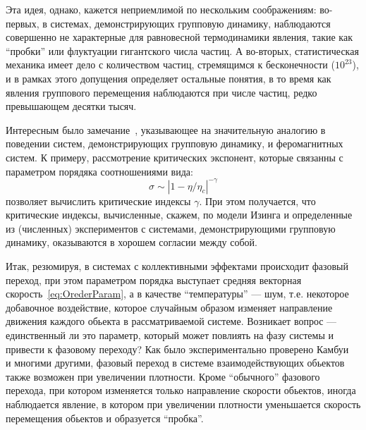     Эта идея, однако, кажется неприемлимой по нескольким соображениям: во-первых, в системах, демонстрирующих групповую динамику, наблюдаются совершенно не характерные для равновесной термодинамики явления, такие как ``пробки'' или флуктуации гигантского числа частиц. А во-вторых, статистическая механика имеет дело с количеством частиц, стремящимся к бесконечности ($10^{23}$), и в рамках этого допущения определяет остальные понятия, в то время как явления группового перемещения наблюдаются при числе частиц, редко превышающем десятки тысяч.

    Интересным было замечание~\cite{tu2000}, указывающее на значительную аналогию в поведении систем, демонстрирующих групповую динамику, и феромагнитных систем. К примеру, рассмотрение критических экспонент, которые связанны с параметром порядяка соотношениями вида:
    \begin{equation}
        \sigma \sim |1-\eta/\eta_c|^{-\gamma}
    \end{equation}
    позволяет вычислить критические индексы $\gamma$. При этом получается, что критические индексы, вычисленные, скажем, по модели Изинга и определенные из (численных) экспериментов с системами, демонстрирующими групповую динамику, оказываются в хорошем согласии между собой.

    Итак, резюмируя, в системах с коллективными эффектами происходит фазовый переход, при этом параметром порядка выступает средняя векторная скорость~\ref{eq:OrederParam}, а в качестве ``температуры'' --- шум, т.е. некоторое добавочное воздействие, которое случайным образом изменяет направление движения каждого обьекта в рассматриваемой системе. Возникает вопрос --- единственный ли это параметр, который может повлиять на фазу системы и привести к фазовому переходу? Как было экспериментально проверено Камбуи~\cite{cambui2012} и многими другими, фазовый переход в системе взаимодействующих обьектов также возможен при увеличении плотности. Кроме ``обычного'' фазового перехода, при котором изменяется только направление скорости обьектов, иногда наблюдается явление, в котором при увеличении плотности уменьшается скорость перемещения обьектов и образуется ``пробка''.~\cite{keller1971}
